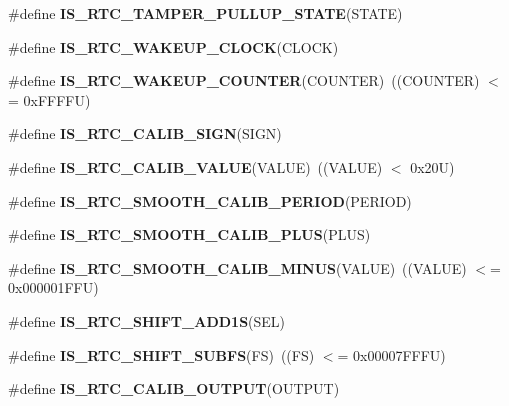 \begin{DoxyCompactItemize}
\item 
\#define {\bfseries I\+S\+\_\+\+R\+T\+C\+\_\+\+T\+A\+M\+P\+E\+R\+\_\+\+P\+U\+L\+L\+U\+P\+\_\+\+S\+T\+A\+TE}(S\+T\+A\+TE)
\item 
\#define {\bfseries I\+S\+\_\+\+R\+T\+C\+\_\+\+W\+A\+K\+E\+U\+P\+\_\+\+C\+L\+O\+CK}(C\+L\+O\+CK)
\item 
\mbox{\label{group___r_t_c_ex___i_s___r_t_c___definitions_ga6254b48843bdcb83b5b5cd640aeb6f9c}} 
\#define {\bfseries I\+S\+\_\+\+R\+T\+C\+\_\+\+W\+A\+K\+E\+U\+P\+\_\+\+C\+O\+U\+N\+T\+ER}(C\+O\+U\+N\+T\+ER)~((C\+O\+U\+N\+T\+ER) $<$= 0x\+F\+F\+F\+F\+U)
\item 
\#define {\bfseries I\+S\+\_\+\+R\+T\+C\+\_\+\+C\+A\+L\+I\+B\+\_\+\+S\+I\+GN}(S\+I\+GN)
\item 
\mbox{\label{group___r_t_c_ex___i_s___r_t_c___definitions_gafa25555b5daedee7b1fcba41afa6ed8b}} 
\#define {\bfseries I\+S\+\_\+\+R\+T\+C\+\_\+\+C\+A\+L\+I\+B\+\_\+\+V\+A\+L\+UE}(V\+A\+L\+UE)~((V\+A\+L\+UE) $<$ 0x20\+U)
\item 
\#define {\bfseries I\+S\+\_\+\+R\+T\+C\+\_\+\+S\+M\+O\+O\+T\+H\+\_\+\+C\+A\+L\+I\+B\+\_\+\+P\+E\+R\+I\+OD}(P\+E\+R\+I\+OD)
\item 
\#define {\bfseries I\+S\+\_\+\+R\+T\+C\+\_\+\+S\+M\+O\+O\+T\+H\+\_\+\+C\+A\+L\+I\+B\+\_\+\+P\+L\+US}(P\+L\+US)
\item 
\mbox{\label{group___r_t_c_ex___i_s___r_t_c___definitions_ga257f8bd6835bee480a80416bf086e200}} 
\#define {\bfseries I\+S\+\_\+\+R\+T\+C\+\_\+\+S\+M\+O\+O\+T\+H\+\_\+\+C\+A\+L\+I\+B\+\_\+\+M\+I\+N\+US}(V\+A\+L\+UE)~((V\+A\+L\+UE) $<$= 0x000001\+F\+F\+U)
\item 
\#define {\bfseries I\+S\+\_\+\+R\+T\+C\+\_\+\+S\+H\+I\+F\+T\+\_\+\+A\+D\+D1S}(S\+EL)
\item 
\mbox{\label{group___r_t_c_ex___i_s___r_t_c___definitions_ga8ad118d512f7dc9ce3d4b6669fd3f4b4}} 
\#define {\bfseries I\+S\+\_\+\+R\+T\+C\+\_\+\+S\+H\+I\+F\+T\+\_\+\+S\+U\+B\+FS}(FS)~((FS) $<$= 0x00007\+F\+F\+F\+U)
\item 
\#define {\bfseries I\+S\+\_\+\+R\+T\+C\+\_\+\+C\+A\+L\+I\+B\+\_\+\+O\+U\+T\+P\+UT}(O\+U\+T\+P\+UT)
\end{DoxyCompactItemize}


